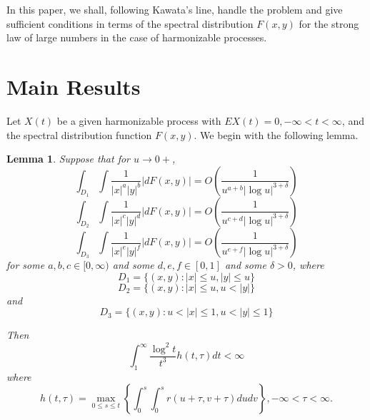 \documentclass{article}
\newtheorem{lemma}{Lemma}
\begin{document}
In this paper, we shall, following Kawata's line, handle the problem and give sufficient conditions in terms of the spectral distribution $F(x,y)$ for the strong law of large numbers in the case of harmonizable processes.

\section{Main Results}

Let $X(t)$ be a given harmonizable process with $EX(t)=0, -\infty < t < \infty$, and the spectral distribution function $F(x,y)$. We begin with the following lemma.

\begin{lemma}\label{lem:1}
Suppose that for $u \rightarrow 0+$,
\begin{equation}\label{eq:19}
\int_{D_{1}} \int \frac{1}{|x|^{a}|y|^{b}}|dF(x,y)|=O\left(\frac{1}{u^{a+b}|\log u|^{3+\delta}}\right)
\end{equation}
\begin{equation}\label{eq:20}
\int_{D_{2}} \int \frac{1}{|x|^{c}|y|^{d}}|dF(x,y)|=O\left(\frac{1}{u^{c+d}|\log u|^{3+\delta}}\right)
\end{equation}
\begin{equation}\label{eq:21}
\int_{D_{3}} \int \frac{1}{|x|^{e}|y|^{f}}|dF(x,y)|=O\left(\frac{1}{u^{e+f}|\log u|^{3+\delta}}\right)
\end{equation}
for some $a, b, c \in [0, \infty)$ and some $d, e, f \in [0,1]$ and some $\delta > 0$, where
\begin{equation}\label{eq:22}
D_{1}=\{(x,y):|x| \leq u, |y| \leq u\}
\end{equation}
\begin{equation}\label{eq:23}
D_{2}=\{(x,y):|x| \leq u, u < |y|\}
\end{equation}
and
\begin{equation}\label{eq:24}
D_{3}=\{(x,y): u < |x| \leq 1, u < |y| \leq 1\}
\end{equation}

Then
\begin{equation}\label{eq:25}
\int_{1}^{\infty} \frac{\log^{2} t}{t^{3}} h(t, \tau) dt < \infty
\end{equation}
where
\begin{equation}\label{eq:26}
h(t, \tau)=\max_{0 \leq s \leq t}\left\{\int_{0}^{s} \int_{0}^{s} r(u+\tau, v+\tau) dudv\right\}, -\infty < \tau < \infty.
\end{equation}
\end{lemma}
\end{document}
